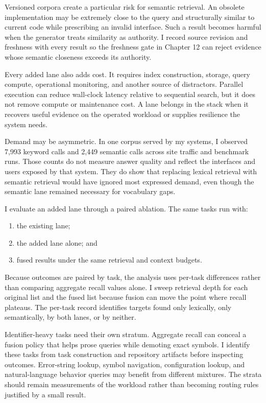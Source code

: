 Versioned corpora create a particular risk for semantic retrieval. An obsolete implementation may be extremely close to the query and structurally similar to current code while prescribing an invalid interface. Such a result becomes harmful when the generator treats similarity as authority. I record source revision and freshness with every result so the freshness gate in Chapter 12 can reject evidence whose semantic closeness exceeds its authority.

Every added lane also adds cost. It requires index construction, storage, query compute, operational monitoring, and another source of distractors. Parallel execution can reduce wall-clock latency relative to sequential search, but it does not remove compute or maintenance cost. A lane belongs in the stack when it recovers useful evidence on the operated workload or supplies resilience the system needs.

Demand may be asymmetric. In one corpus served by my systems, I observed 7,993 keyword calls and 2,449 semantic calls across site traffic and benchmark runs. Those counts do not measure answer quality and reflect the interfaces and users exposed by that system. They do show that replacing lexical retrieval with semantic retrieval would have ignored most expressed demand, even though the semantic lane remained necessary for vocabulary gaps.


I evaluate an added lane through a paired ablation. The same tasks run with:

\begin{enumerate}
\def\labelenumi{\arabic{enumi}.}
\tightlist
\item
  the existing lane;
\item
  the added lane alone; and
\item
  fused results under the same retrieval and context budgets.
\end{enumerate}

Because outcomes are paired by task, the analysis uses per-task differences rather than comparing aggregate recall values alone. I sweep retrieval depth for each original list and the fused list because fusion can move the point where recall plateaus. The per-task record identifies targets found only lexically, only semantically, by both lanes, or by neither.

Identifier-heavy tasks need their own stratum. Aggregate recall can conceal a fusion policy that helps prose queries while demoting exact symbols. I identify these tasks from task construction and repository artifacts before inspecting outcomes. Error-string lookup, symbol navigation, configuration lookup, and natural-language behavior queries may benefit from different mixtures. The strata should remain measurements of the workload rather than becoming routing rules justified by a small result.

